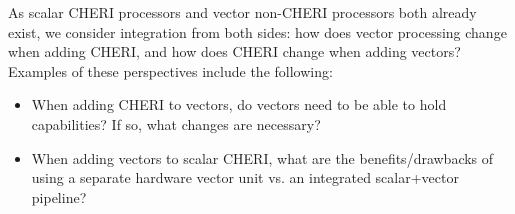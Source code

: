 As scalar CHERI processors and vector non-CHERI processors both already exist, we consider integration from both sides: how does vector processing change when adding CHERI, and how does CHERI change when adding vectors?
Examples of these perspectives include the following:
\begin{itemize}
    \item When adding CHERI to vectors, do vectors need to be able to hold capabilities? If so, what changes are necessary?
    \item When adding vectors to scalar CHERI, what are the benefits/drawbacks of using a separate hardware vector unit vs. an integrated scalar+vector pipeline?
\end{itemize}


